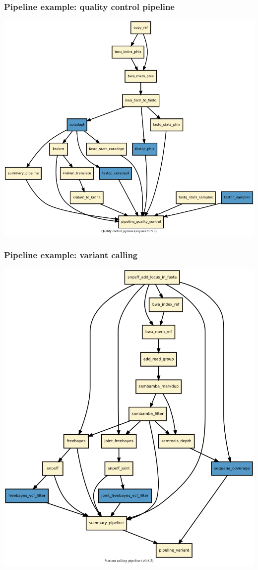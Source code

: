 \documentclass{beamer}
\begin{document}
\begin{frame}
\frametitle{Pipeline example: quality control pipeline} 
\centering
\includegraphics[height=0.8\textheight, width=\textwidth]{./images/dag2.png}
\end{frame}



\begin{frame}
\frametitle{Pipeline example: variant calling} 
\centering
\includegraphics[height=0.8\textheight, 
width=\textwidth]{./images/variant_calling_dag.png}
\end{frame}
\end{document}
